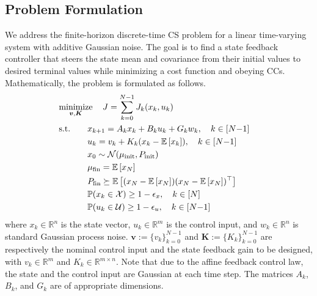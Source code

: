 \subsection{Problem Formulation}
We address the finite-horizon discrete-time CS problem for a linear time-varying system with additive Gaussian noise. The goal is to find a state feedback controller that steers the state mean and covariance from their initial values to desired terminal values while minimizing a cost function and obeying CCs. Mathematically, the problem is formulated as follows.
\begin{subequations}
\label{eq:problem_statement}
\begin{align}
	& \mathrlap{\minimize_{\bm{v}, \bm{K}} \quad J = \sum_{k=0}^{N-1} J_k (x_k, u_k) }\\
	& \suchthat &&x_{k+1} = A_k x_k + B_k u_k + G_k w_k, \quad k \in [N{-}1] \\
	& && u_k = v_k + K_k (x_k - \E{x_k}), \quad k \in [N{-}1] \label{eq:feedback_control_law}\\
	& &&x_0 \sim \mathcal{N}(\mu_{\mathrm{init}}, P_{\mathrm{init}}) \\
	& &&\mu_{\mathrm{fin}} = \E{x_N}\\
	& &&P_{\mathrm{fin}} \succeq \E{(x_N - \E{x_N})(x_N - \E{x_N})^\top} \\
	& &&\mathbb{P}(x_k \in \mathcal{X}) \geq 1 - \epsilon_x, \quad k \in [N] \label{eq:state_chance_constraint}\\ 
	& &&\mathbb{P}(u_k \in \mathcal{U}) \geq 1 - \epsilon_u, \quad k \in [N{-}1] \label{eq:control_chance_constraint}
\end{align}
\end{subequations}
where \( x_k \in \mathbb{R}^n \) is the state vector, \( u_k \in \mathbb{R}^m \) is the control input, and \( w_k \in \mathbb{R}^n \) is standard Gaussian process noise. \( \bm{v} := \{v_k\}_{k=0}^{N-1}\) and \(\bm{K} := \{K_k\}_{k=0}^{N-1}\) are respectively the nominal control input and the state feedback gain to be designed, with \( v_k \in \mathbb{R}^m \) and \( K_k \in \mathbb{R}^{m \times n} \). Note that due to the affine feedback control law, the state and the control input are Gaussian at each time step.
The matrices \( A_k \), \( B_k \), and \( G_k \) are of appropriate dimensions.

